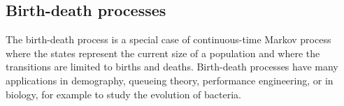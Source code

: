 ﻿%
\subsection*{Birth-death processes}
The birth-death process is a special case of continuous-time Markov process where the states represent the current size of a population and where the transitions are limited to births and deaths.
Birth-death processes have many applications in demography, queueing theory, performance engineering, or in biology, for example to study the evolution of bacteria.


